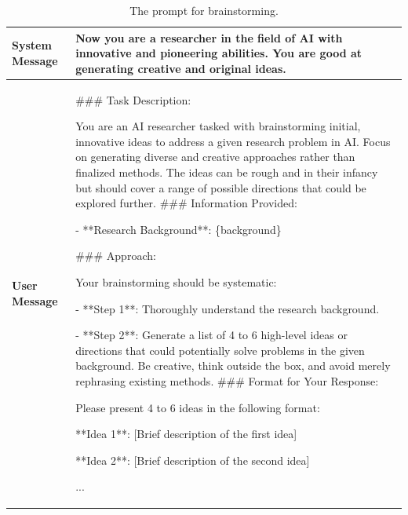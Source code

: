 \documentclass{article}
\theoremstyle{plain}
\theoremstyle{definition}
\theoremstyle{remark}
\begin{document}
\begin{table}[htbp]
	\centering  %
	\caption{The prompt for brainstorming.}  %
	\label{tab:brst}  %
	\begin{tabular}{l | m{}}  
		\toprule  %
            \textbf{System Message} & Now you are a researcher in the field of AI with innovative and pioneering abilities. You are good at generating creative and original ideas. \\
            \midrule
            \textbf{User Message} & \#\#\# Task Description: 

You are an AI researcher tasked with brainstorming initial, innovative ideas to address a given research problem in AI. Focus on generating diverse and creative approaches rather than finalized methods. The ideas can be rough and in their infancy but should cover a range of possible directions that could be explored further.
\newline\linebreak
\#\#\# Information Provided:

- **Research Background**: \{background\}
\newline\linebreak

\#\#\# Approach:

Your brainstorming should be systematic:

- **Step 1**: Thoroughly understand the research background.

- **Step 2**: Generate a list of 4 to 6 high-level ideas or directions that could potentially solve problems in the given background. Be creative, think outside the box, and avoid merely rephrasing existing methods.
\newline\linebreak
\#\#\# Format for Your Response:

Please present 4 to 6 ideas in the following format:

**Idea 1**: [Brief description of the first idea]

**Idea 2**: [Brief description of the second idea]

... \\
\bottomrule
\end{tabular}
\end{table}
\end{document}
